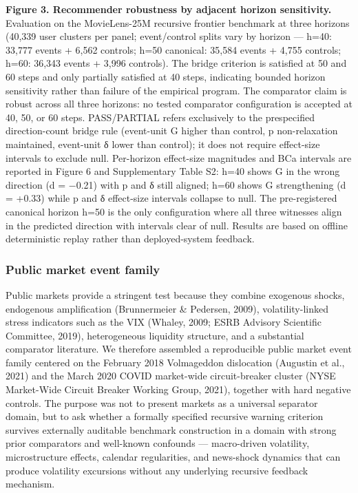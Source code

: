 \documentclass[
  11pt,
]{article}
\begin{document}
\textbf{Figure 3. Recommender robustness by adjacent horizon
sensitivity.} Evaluation on the MovieLens-25M recursive frontier
benchmark at three horizons (40,339 user clusters per panel;
event/control splits vary by horizon --- h=40: 33,777 events + 6,562
controls; h=50 canonical: 35,584 events + 4,755 controls; h=60: 36,343
events + 3,996 controls). The bridge criterion is satisfied at 50 and 60
steps and only partially satisfied at 40 steps, indicating bounded
horizon sensitivity rather than failure of the empirical program. The
comparator claim is robust across all three horizons: no tested
comparator configuration is accepted at 40, 50, or 60 steps.
PASS/PARTIAL refers exclusively to the prespecified direction-count
bridge rule (event-unit G higher than control, p non-relaxation
maintained, event-unit δ lower than control); it does not require
effect-size intervals to exclude null. Per-horizon effect-size
magnitudes and BCa intervals are reported in Figure 6 and Supplementary
Table S2: h=40 shows G in the wrong direction (d = −0.21) with p and δ
still aligned; h=60 shows G strengthening (d = +0.33) while p and δ
effect-size intervals collapse to null. The pre-registered canonical
horizon h=50 is the only configuration where all three witnesses align
in the predicted direction with intervals clear of null. Results are
based on offline deterministic replay rather than deployed-system
feedback.

\subsubsection{Public market event
family}\label{public-market-event-family}

Public markets provide a stringent test because they combine exogenous
shocks, endogenous amplification (Brunnermeier \& Pedersen, 2009),
volatility-linked stress indicators such as the VIX (Whaley, 2009; ESRB
Advisory Scientific Committee, 2019), heterogeneous liquidity structure,
and a substantial comparator literature. We therefore assembled a
reproducible public market event family centered on the February 2018
Volmageddon dislocation (Augustin et al., 2021) and the March 2020 COVID
market-wide circuit-breaker cluster (NYSE Market-Wide Circuit Breaker
Working Group, 2021), together with hard negative controls. The purpose
was not to present markets as a universal separator domain, but to ask
whether a formally specified recursive warning criterion survives
externally auditable benchmark construction in a domain with strong
prior comparators and well-known confounds --- macro-driven volatility,
microstructure effects, calendar regularities, and news-shock dynamics
that can produce volatility excursions without any underlying recursive
feedback mechanism.
\end{document}
